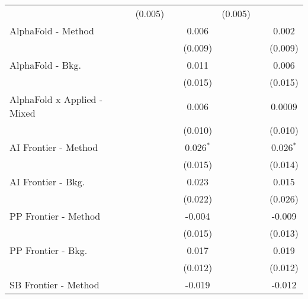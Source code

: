 \begin{tabular}{lcccccc}
                                  & (0.005)      &               &               & (0.005)       &               &   \\   
   AlphaFold - Method             &              &               & 0.006         &               &               & 0.002\\   
                                  &              &               & (0.009)       &               &               & (0.009)\\   
   AlphaFold - Bkg.               &              &               & 0.011         &               &               & 0.006\\   
                                  &              &               & (0.015)       &               &               & (0.015)\\   
   AlphaFold x Applied - Mixed    &              &               & 0.006         &               &               & 0.0009\\   
                                  &              &               & (0.010)       &               &               & (0.010)\\   
   AI Frontier - Method           &              &               & 0.026$^{*}$   &               &               & 0.026$^{*}$\\   
                                  &              &               & (0.015)       &               &               & (0.014)\\   
   AI Frontier - Bkg.             &              &               & 0.023         &               &               & 0.015\\   
                                  &              &               & (0.022)       &               &               & (0.026)\\   
   PP Frontier - Method           &              &               & -0.004        &               &               & -0.009\\   
                                  &              &               & (0.015)       &               &               & (0.013)\\   
   PP Frontier - Bkg.             &              &               & 0.017         &               &               & 0.019\\   
                                  &              &               & (0.012)       &               &               & (0.012)\\   
   SB Frontier - Method           &              &               & -0.019        &               &               & -0.012\\   

\end{tabular}
